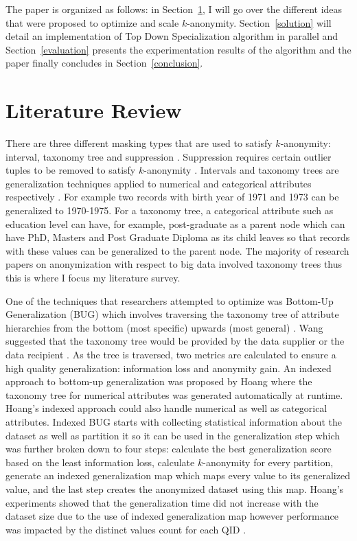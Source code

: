 \documentclass[11pt]{article}       %
\begin{document}
The paper is organized as follows: in Section~\ref{literature}, I will go over the different ideas that were proposed to optimize and scale $k$-anonymity. Section~\ref{solution} will detail an implementation of Top Down Specialization algorithm in parallel and Section~\ref{evaluation} presents the experimentation results of the algorithm and the paper finally concludes in Section~\ref{conclusion}.

\section{Literature Review} \label{literature}

There are three different masking types that are used to satisfy $k$-anonymity: interval, taxonomy tree and suppression \cite{Al-Zobbi-Mohammed:2018}. Suppression requires certain outlier tuples to be removed to satisfy $k$-anonymity \cite{Samarati-P.:1998}. Intervals and taxonomy trees are generalization techniques applied to numerical and categorical attributes respectively \cite{Samarati-P.:1998}. For example two records with birth year of 1971 and 1973 can be generalized to 1970-1975. For a taxonomy tree, a categorical attribute such as education level can have, for example, post-graduate as a parent node which can have PhD, Masters and Post Graduate Diploma as its child leaves so that records with these values can be generalized to the parent node. The majority of research papers on anonymization with respect to big data involved taxonomy trees thus this is where I focus my literature survey.

One of the techniques that researchers attempted to optimize was Bottom-Up Generalization (BUG) which involves traversing the taxonomy tree of attribute hierarchies from the bottom (most specific) upwards (most general) \cite{Ke-Wang:2004}. Wang suggested that the taxonomy tree would be provided by the data supplier or the data recipient \cite{Ke-Wang:2004}. As the tree is traversed, two metrics are calculated to ensure a high quality generalization: information loss and anonymity gain. An indexed approach to bottom-up generalization was proposed by Hoang \cite{Hoang:2012} where the taxonomy tree for numerical attributes was generated automatically at runtime. Hoang's indexed approach could also handle numerical as well as categorical attributes. Indexed BUG starts with collecting statistical information about the dataset as well as partition it so it can be used in the generalization step which was further broken down to four steps: calculate the best generalization score based on the least information loss, calculate $k$-anonymity for every partition, generate an indexed generalization map which maps every value to its generalized value, and the last step creates the anonymized dataset using this map. Hoang's experiments showed that the generalization time did not increase with the dataset size due to the use of indexed generalization map however performance was impacted by the distinct values count for each QID \cite{Hoang:2012}.
\end{document}
